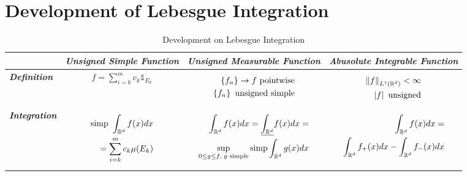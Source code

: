 \documentclass[11pt]{article}
\begin{document}
\section{Development of Lebesgue Integration}
\begin{table}[h!]
\setlength{\abovedisplayskip}{0pt}
\setlength{\belowdisplayskip}{-10pt}
\setlength{\abovedisplayshortskip}{0pt}
\setlength{\belowdisplayshortskip}{0pt}
\footnotesize
\centering
\caption{Development on Lebesgue Integration}
\label{tab: integration}
\renewcommand\tabularxcolumn[1]{m{#1}}
\small
\begin{tabularx}{1\textwidth} { 
  | >{\raggedright\arraybackslash} m{3cm}
  | >{\centering\arraybackslash}X
  | >{\centering\arraybackslash}X
  | >{\centering\arraybackslash}X  | }
 \hline
  &  \emph{\textbf{Unsigned Simple Function}} & \emph{\textbf{Unsigned Measurable Function}}   &  \emph{\textbf{Abusolute Integrable Function}}   \\
  \hline 
\textbf{\emph{Definition}}    &
\begin{align*}
f = \sum_{i=k}^{m}c_k \mathds{1}_{E_k}
\end{align*}
 & 
 \begin{align*}
\left\{f_n\right\} \rightarrow f \text{ pointwise}\\
\left\{f_n\right\} \text{ unsigned simple}
\end{align*}
 & 
\begin{align*}
\left\|f\right\|_{L^1({\mathbb R}^d)} < \infty\\
\left\lvert f \right\rvert \text{ unsigned}
\end{align*}
\\
 \hline \vspace{5pt}
\emph{\textbf{Integration}}  \vspace{2pt} &  
\begin{align*}
\text{simp }\int_{{\mathbb R}^d} f(x) dx \\
= \sum_{i=k}^{m}c_k \mu(E_k)
\end{align*}
 &
 \begin{align*}
\int_{{\mathbb R}^{d}}f(x)dx =  \underline{\int_{{\mathbb R}^{d}}}f(x)dx =\\
  \sup\limits_{0\le g\le f,\; g\text{ simple}} \text{simp}\int_{{\mathbb R}^{d}}g(x) dx
 \end{align*}
  & \begin{align*}
\int_{{\mathbb R}^{d}}f(x)dx =\\
 \int_{{\mathbb R}^{d}}f_{+}(x)dx - \int_{{\mathbb R}^{d}}f_{-}(x)dx
\end{align*}  \\

\end{tabularx}
\end{table}
\end{document}
